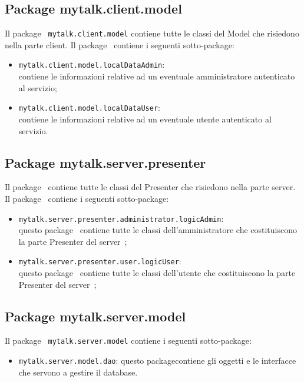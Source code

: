 	
	
\subsection{Package mytalk.client.model}	
Il package\g~ \texttt{mytalk.client.model} contiene tutte le classi del Model che risiedono nella parte client\g . Il package\g~ contiene i seguenti sotto-package\g:
	\begin{itemize}
		\item \texttt{mytalk.client.model.localDataAdmin}: \\contiene le informazioni relative ad un eventuale amministratore autenticato al servizio;
		\item \texttt{mytalk.client.model.localDataUser}: \\contiene le informazioni relative ad un eventuale utente autenticato al servizio.
	\end{itemize}
	
	
\subsection{Package mytalk.server.presenter}
Il package\g~ contiene tutte le classi del Presenter che risiedono nella parte server\g . Il package\g~ contiene i seguenti sotto-package\g:
	\begin{itemize}
		\item \texttt{mytalk.server.presenter.administrator.logicAdmin}: \\questo package\g~ contiene tutte le classi dell'amministratore che costituiscono la parte Presenter del server\g~;
		\item \texttt{mytalk.server.presenter.user.logicUser}:\\questo package\g~ contiene tutte le classi dell'utente che costituiscono la parte Presenter del server\g~;
	\end{itemize}



\subsection{Package mytalk.server.model}
Il package\g~ \texttt{mytalk.server.model} contiene i seguenti sotto-package\g :
\begin{itemize}
\item \texttt{mytalk.server.model.dao}: questo package\g contiene gli oggetti e le interfacce che servono a gestire il database\g.
\end{itemize}





















